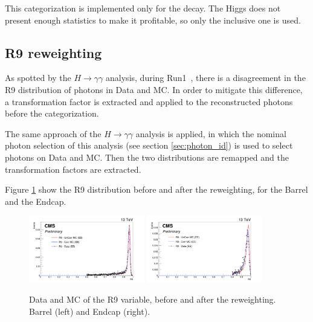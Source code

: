 This categorization is implemented only for the \Z decay. The Higgs does not present enough statistics to make it profitable, so only the inclusive one is used. 

\subsection{R9 reweighting}

As spotted by the $H \rightarrow \gamma\gamma$ analysis, during Run1~\cite{higgs_gammagamma_PAPPER}, there is a disagreement in the R9 distribution of photons in Data and MC. In order to mitigate this difference, a transformation factor is extracted and applied to the reconstructed photons before the categorization.

The same approach of the $H \rightarrow \gamma\gamma$ analysis is applied, in which the nominal photon selection of this analysis (see section \ref{sec:photon_id}) is used to select photons on Data and MC. Then the two distributions are remapped and the transformation factors are extracted. 

Figure \ref{fig:r9_reweighting} show the R9 distribution before and after the reweighting, for the Barrel and the Endcap.


\begin{figure}[!htbp]
\begin{center}
\includegraphics[width=0.45\textwidth]{figures_and_tables/R9/R9EB.png}\hspace*{1.cm}
\includegraphics[width=0.45\textwidth]{figures_and_tables/R9/R9EE.png}
\end{center}\vspace*{-.5cm}
\caption{Data and MC of the R9 variable, before and after the reweighting. Barrel (left) and Endcap (right).}
\label{fig:r9_reweighting}
\end{figure}

